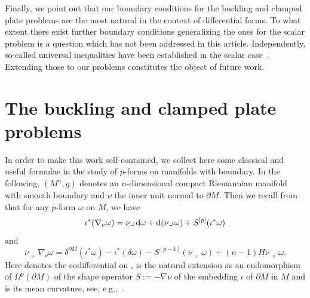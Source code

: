 \documentclass[pdftex]{sigma}
\numberwithin{equation}{section}
\theoremstyle{definition}
\begin{document}
Finally, we point out that our boundary conditions for the buckling and clamped plate problems are the most natural in the context of differential forms.
To what extent there exist further boundary conditions generalizing the ones for the scalar problem is a question which has not been addressed in this article.
Independently, so-called universal inequalities have been established in the scalar case~\cite{ChengYang2006,ChengYang2012,DuMaoWang2016}.
Extending those to our problems constitutes the object of future work.

\section{The buckling and clamped plate problems}

In order to make this work self-contained, we collect here some classical and useful formulae in the study of $p$-forms on manifolds with boundary. In the following, $(M^n,g)$ denotes an $n$-dimensional compact Riemannian manifold with smooth boundary and $\nu$ the inner unit normal to $\partial M$. Then we recall from~\cite[Lemma 18]{RaulotSavo2011} that for any $p$-form $\omega$ on $M$, we have
\begin{equation}\label{eq:iotastarnablanuomega}
\iota^*(\nabla_\nu\omega)=\nu\lrcorner\,{\rm d}\omega+{\rm d}(\nu\lrcorner\,\omega)+S^{[p]}(\iota^*\omega)
\end{equation}
and
\begin{equation}\label{eq:nuintnablanuomega}
\nu\lrcorner\,\nabla_\nu\omega = \delta^{\partial M}(\iota^*\omega)-\iota^*(\delta\omega)-S^{[p-1]}(\nu\lrcorner\,\omega)+(n-1)H\nu\lrcorner\,\omega.
\end{equation}
Here  denotes the codifferential on ,  is the natural extension as an endomorphism of $\Omega^{p}(\partial M)$ of the shape operator $S:=-\nabla\nu$ of the embedding $\iota$ of $\partial M$ in $M$ and  is its mean curvature, see, e.g.,~\cite[p.~624]{RaulotSavo2011}.
\end{document}
